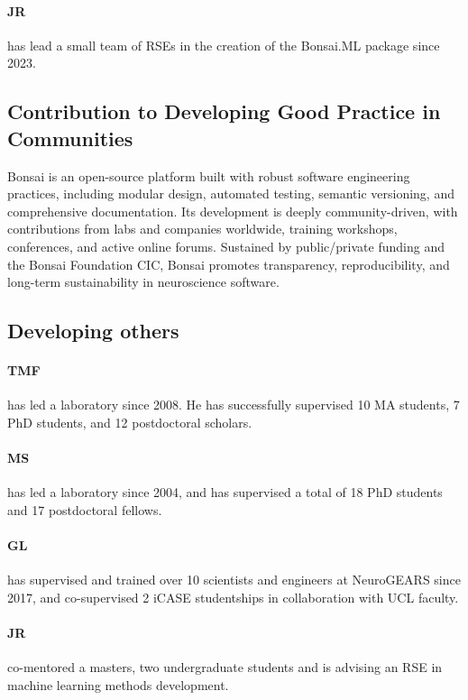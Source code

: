 \paragraph{JR} has lead a small team of RSEs in the
creation of the Bonsai.ML package since 2023.

\subsection{Contribution to Developing Good Practice in Communities}

Bonsai is an open-source platform built with robust software engineering
practices, including modular design, automated testing, semantic versioning,
and comprehensive documentation. Its development is deeply community-driven,
with contributions from labs and companies worldwide, training workshops,
conferences, and active online forums. Sustained by public/private funding and
the Bonsai Foundation CIC, Bonsai promotes transparency, reproducibility, and
long-term sustainability in neuroscience software.  \subsection{Developing
others}

\paragraph{TMF} has led a laboratory since 2008. He has
successfully supervised 10 MA students, 7 PhD students, and 12 postdoctoral
scholars.

\paragraph{MS} has led a laboratory since 2004, and has supervised a total of 18 PhD students and
17 postdoctoral fellows.

\paragraph{GL} has supervised and trained over 10 scientists and engineers at
NeuroGEARS since 2017, and co-supervised 2 iCASE studentships in collaboration
with UCL faculty.

\paragraph{JR} co-mentored a masters, two undergraduate
students and is advising an RSE in machine learning methods development.
